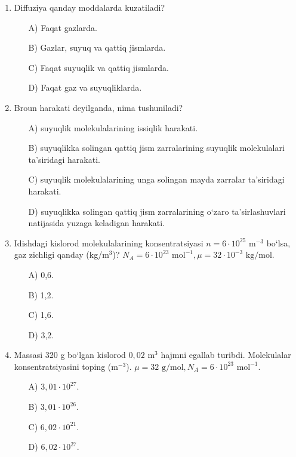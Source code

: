 \begin{enumerate}
\begin{itemize}
    \end{itemize}

    \item Diffuziya qanday moddalarda kuzatiladi?
    \begin{itemize}
        \item[A)] Faqat gazlarda.
        \item[B)] Gazlar, suyuq va qattiq jismlarda.
        \item[C)] Faqat suyuqlik va qattiq jismlarda.
        \item[D)] Faqat gaz va suyuqliklarda.
       
    \end{itemize}

    \item Broun harakati deyilganda, nima tushuniladi? 
    \begin{itemize}
        \item[A)] suyuqlik molekulalarining issiqlik harakati.
        \item[B)] suyuqlikka solingan qattiq jism zarralarining suyuqlik molekulalari ta’siridagi harakati.
        \item[C)] suyuqlik molekulalarining unga solingan mayda zarralar ta’siridagi harakati.
        \item[D)] suyuqlikka solingan qattiq jism zarralarining o‘zaro ta’sirlashuvlari natijasida yuzaga keladigan harakati.
    \end{itemize}

    \item Idishdagi kislorod molekulalarining konsentratsiyasi $n = 6 \cdot 10^{25} \text{ m}^{-3}$ bo‘lsa, gaz zichligi qanday (kg/m$^3$)? $N_A = 6 \cdot 10^{23} \text{ mol}^{-1}, \mu = 32 \cdot 10^{-3} \text{ kg/mol}$.
    \begin{itemize}
        \item[A)] 0,6.
        \item[B)] 1,2.
        \item[C)] 1,6.
        \item[D)] 3,2.
        
    \end{itemize}

    \item Massasi 320 g bo‘lgan kislorod $0,02 \text{ m}^3$ hajmni egallab turibdi. Molekulalar konsentratsiyasini toping (m$^{-3}$). $\mu = 32 \text{ g/mol}, N_A = 6 \cdot 10^{23} \text{ mol}^{-1}$.
    \begin{itemize}
        \item[A)] $3,01 \cdot 10^{27}$.
        \item[B)] $3,01 \cdot 10^{26}$.
        \item[C)] $6,02 \cdot 10^{21}$.
        \item[D)] $6,02 \cdot 10^{27}$.
       
    \end{itemize}

\end{enumerate}












